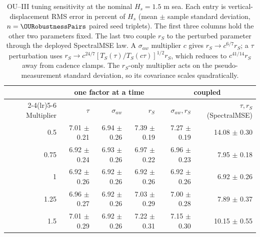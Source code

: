 
\begin{table}[t]
  \centering
  \caption{OU--III tuning sensitivity at the nominal $H_s=1.5$ m sea. Each entry is vertical-displacement RMS error in percent of $H_s$ (mean $\pm$ sample standard deviation, $n=\OURobustnessPairs$ paired seed triplets). The first three columns hold the other two parameters fixed. The last two couple $r_S$ to the perturbed parameter through the deployed SpectralMSE law. A $\sigma_{aw}$ multiplier $c$ gives $r_S\to c^{6/7}r_S$; a $\tau$ perturbation uses $r_S\to c^{24/7}[T_S(\tau)/T_S(c\tau)]^{1/2}r_S$, which reduces to $c^{41/14}r_S$ away from cadence clamps. The $r_S$-only multiplier acts on the pseudo-measurement standard deviation, so its covariance scales quadratically.}
  \label{tab:ou_robustness_sensitivity}
  \footnotesize
  \setlength{\tabcolsep}{7pt}
  \begin{tabular}{@{}rrrrrr@{}}
    \toprule
    & \multicolumn{3}{c}{one factor at a time} & \multicolumn{2}{c}{coupled} \\
    \cmidrule(lr){2-4}\cmidrule(lr){5-6}
    Multiplier & $\tau$ & $\sigma_{aw}$ & $r_S$ & $\sigma_{aw},r_S$ & $\tau,r_S$ (SpectralMSE) \\
    \midrule
    0.5 & 7.01 $\pm$ 0.21 & 6.94 $\pm$ 0.26 & 7.39 $\pm$ 0.19 & 7.27 $\pm$ 0.19 & 14.08 $\pm$ 0.30 \\
    0.75 & 6.92 $\pm$ 0.24 & 6.93 $\pm$ 0.26 & 6.97 $\pm$ 0.22 & 6.96 $\pm$ 0.23 & 7.95 $\pm$ 0.18 \\
    1 & 6.92 $\pm$ 0.26 & 6.92 $\pm$ 0.26 & 6.92 $\pm$ 0.26 & 6.92 $\pm$ 0.26 & 6.92 $\pm$ 0.26 \\
    1.25 & 6.96 $\pm$ 0.27 & 6.92 $\pm$ 0.26 & 7.03 $\pm$ 0.29 & 7.00 $\pm$ 0.28 & 7.89 $\pm$ 0.37 \\
    1.5 & 7.01 $\pm$ 0.29 & 6.92 $\pm$ 0.26 & 7.22 $\pm$ 0.31 & 7.15 $\pm$ 0.30 & 10.15 $\pm$ 0.55 \\
    \bottomrule
  \end{tabular}
\end{table}

